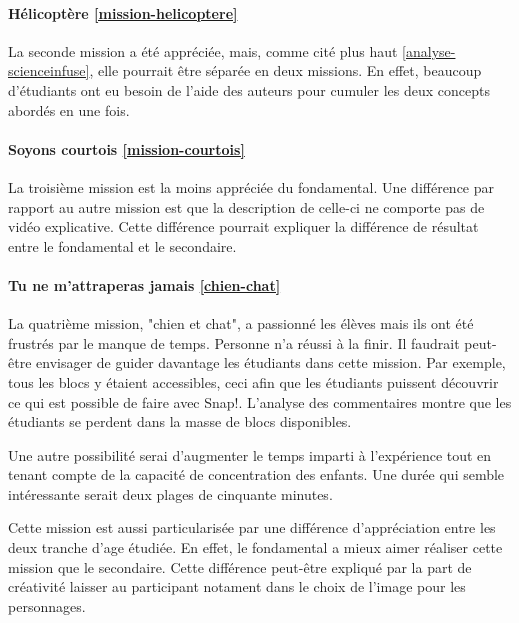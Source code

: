 \paragraph{Hélicoptère \ref{mission-helicoptere}}
La seconde mission a été appréciée, mais, comme cité plus haut \ref{analyse-scienceinfuse}, elle pourrait être séparée en deux missions. En effet, beaucoup d'étudiants ont eu besoin de l'aide des auteurs pour cumuler les deux concepts abordés en une fois.

\paragraph{Soyons courtois \ref{mission-courtois}}
La troisième mission est la moins appréciée du fondamental. Une différence par rapport au autre mission est que la description de celle-ci ne comporte pas de vidéo explicative. Cette différence pourrait expliquer la différence de résultat entre le fondamental et le secondaire.

\paragraph{Tu ne m'attraperas jamais \ref{chien-chat}}
La quatrième mission, "chien et chat", a passionné les élèves mais ils ont été frustrés par le manque de temps. Personne n'a réussi à la finir. Il faudrait peut-être envisager de guider davantage les étudiants dans cette mission. Par exemple, tous les blocs y étaient accessibles, ceci afin que les étudiants puissent découvrir ce qui est possible de faire avec Snap!. L'analyse des commentaires montre que les étudiants se perdent dans la masse de blocs disponibles.

Une autre possibilité serai d'augmenter le temps imparti à l'expérience tout en tenant compte de la capacité de concentration des enfants. Une durée qui semble intéressante serait deux plages de cinquante minutes.

Cette mission est aussi particularisée par une différence d'appréciation entre les deux tranche d'age étudiée. En effet, le fondamental a mieux aimer réaliser cette mission que le secondaire. Cette différence peut-être expliqué par la part de créativité laisser au participant notament dans le choix de l'image pour les personnages.

